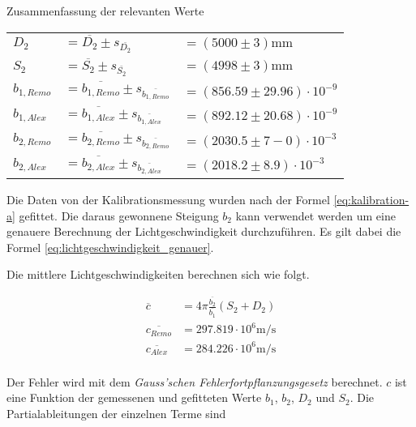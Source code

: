 \begin{center}
    \begin{threeparttable}
        \caption{Zusammenfassung der relevanten Werte}
        \label{tab:kalibration-werte}
        \begin{tabular}{llp{50mm}}
            \toprule
            $D_2$            & $= \overline{D_2} \pm s_{\overline{D_2}}$                     & $= (5000 \pm 3)\textrm{mm}$ \\
            $S_2$            & $= \overline{S_2} \pm s_{\overline{S_2}}$                     & $= (4998 \pm 3)\textrm{mm}$ \\
            $b_{1,Remo}$     & $= \overline{b_{1,Remo}} \pm s_{\overline{b_{1,Remo}}}$       & $= (856.59 \pm 29.96) \cdot 10^{-9}$ \\
            $b_{1,Alex}$     & $= \overline{b_{1,Alex}} \pm s_{\overline{b_{1,Alex}}}$       & $= (892.12 \pm 20.68) \cdot 10^{-9}$ \\
            $b_{2,Remo}$     & $= \overline{b_{2,Remo}} \pm s_{\overline{b_{2,Remo}}}$       & $= (2030.5 \pm 7-0) \cdot 10^{-3}$ \\
            $b_{2,Alex}$     & $= \overline{b_{2,Alex}} \pm s_{\overline{b_{2,Alex}}}$       & $= (2018.2 \pm 8.9) \cdot 10^{-3}$ \\
            \bottomrule
        \end{tabular}
    \end{threeparttable}
\end{center}

Die   Daten   von   der    Kalibrationsmessung    wurden   nach   der   Formel
\ref{eq:kalibration-a} gefittet. Die  daraus  gewonnene  Steigung  $b_2$  kann
verwendet  werden  um  eine  genauere  Berechnung   der   Lichtgeschwindigkeit
durchzuf\"uhren.        Es        gilt        dabei         die         Formel
\ref{eq:lichtgeschwindigkeit_genauer}.

Die mittlere Lichtgeschwindigkeiten berechnen sich wie folgt.

\begin{align*}
    \overline{c}            &= 4\pi\frac{\overline{b_2}}{\overline{b_1}}(S_2 + D_2) \\
    \overline{c_{Remo}}     &= 297.819 \cdot 10^6 \textrm{m}/\textrm{s} \\
    \overline{c_{Alex}}     &= 284.226 \cdot 10^6 \textrm{m}/\textrm{s} \\
\end{align*}

Der Fehler wird mit dem \emph{Gauss'schen Fehlerfortpflanzungsgesetz} berechnet.
$c$ ist eine Funktion  der  gemessenen  und gefitteten Werte $b_1$, $b_2$, $D_2$ und
$S_2$. Die Partialableitungen der einzelnen Terme sind

